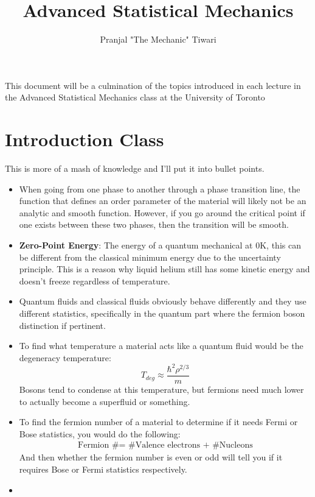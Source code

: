 \documentclass[11pt,onecolumn]{article}
\title{Advanced Statistical Mechanics}
\author{Pranjal "The Mechanic" Tiwari}
\begin{document}
\maketitle

This document will be a culmination of the topics introduced in each lecture in the Advanced Statistical Mechanics class at the University of Toronto

\section{Introduction Class}

This is more of a mash of knowledge and I'll put it into bullet points.

\begin{itemize}
	\item When going from one phase to another through a phase transition line, the function that defines an order parameter of the material will likely not be an analytic and smooth function. However, if you go around the critical point if one exists between these two phases, then the transition will be smooth.
	\item \textbf{Zero-Point Energy}: The energy of a quantum mechanical at 0K, this can be different from the classical minimum energy due to the uncertainty principle. This is a reason why liquid helium still has some kinetic energy and doesn't freeze regardless of temperature.
	\item Quantum fluids and classical fluids obviously behave differently and they use different statistics, specifically in the quantum part where the fermion boson distinction if pertinent.
	\item To find what temperature a material acts like a quantum fluid would be the degeneracy temperature:
	\begin{equation*}
	T_{deg}\approx\frac{\hbar^2\rho^{2/3}}{m}
	\end{equation*}
	Bosons tend to condense at this temperature, but fermions need much lower to actually become a superfluid or something.
	\item To find the fermion number of a material to determine if it needs Fermi or Bose statistics, you would do the following:
	\begin{align*}
	\text{Fermion \# = \# Valence electrons + \# Nucleons}
	\end{align*}
	And then whether the fermion number is even or odd will tell you if it requires Bose or Fermi statistics respectively.
	\item
\end{itemize}
\end{document}
